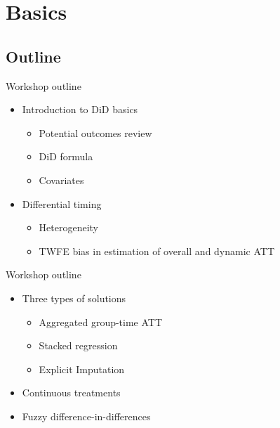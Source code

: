 \documentclass{beamer}
\begin{document}



\section{Basics}

\subsection{Outline}

\begin{frame}{Workshop outline}

\begin{itemize}
\item Introduction to DiD basics 
	\begin{itemize}
	\item Potential outcomes review
	\item DiD formula
	\item Covariates
	\end{itemize}
\item Differential timing
	\begin{itemize}
	\item Heterogeneity
	\item TWFE bias in estimation of overall and dynamic ATT
	\end{itemize}
\end{itemize}

\end{frame}

\begin{frame}{Workshop outline}

\begin{itemize}
\item Three types of solutions
	\begin{itemize}
	\item Aggregated group-time ATT
	\item Stacked regression
	\item Explicit Imputation
	\end{itemize}
\item Continuous treatments
\item Fuzzy difference-in-differences
\end{itemize}

\end{frame}
\end{document}
